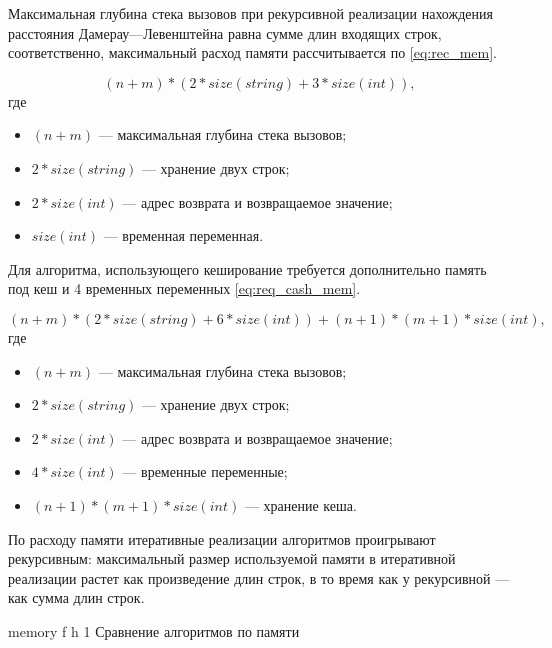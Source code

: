 Максимальная глубина стека вызовов при рекурсивной реализации нахождения расстояния Дамерау---Левенштейна равна сумме длин входящих строк, соответственно, максимальный расход памяти рассчитывается по \eqref{eq:rec_mem}.

\begin{equation}
	\label{eq:rec_mem}
	(n + m) * (2 * size(string) + 3 * size(int)),
\end{equation}
где 
\begin{itemize}
	\item $ (n + m) $ --- максимальная глубина стека вызовов;
	\item $ 2 * size(string) $ --- хранение двух строк;
	\item $ 2 * size(int) $ --- адрес возврата и возвращаемое значение;
	\item $ size(int) $ --- временная переменная.
\end{itemize}

Для алгоритма, использующего кеширование требуется дополнительно память под кеш и 4 временных переменных \eqref{eq:req_cash_mem}.

\begin{equation}
	\label{eq:req_cash_mem}
	(n + m) * (2 * size(string) + 6 * size(int)) + (n + 1) * (m + 1) * size(int),
\end{equation}
где 
\begin{itemize}
	\item $ (n + m) $ --- максимальная глубина стека вызовов;
	\item $ 2 * size(string) $ --- хранение двух строк;
	\item $ 2 * size(int) $ --- адрес возврата и возвращаемое значение;
	\item $ 4 * size(int) $ --- временные переменные;
	\item $ (n + 1) * (m + 1) * size(int) $ --- хранение кеша.
\end{itemize}

По расходу памяти итеративные реализации алгоритмов проигрывают рекурсивным: максимальный размер используемой памяти в итеративной реализации растет как произведение длин строк, в то время как у рекурсивной --- как сумма длин строк.

{memory} %
{f} %
{h} %
{1\textwidth} %
{Сравнение алгоритмов по памяти} %

